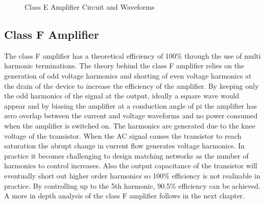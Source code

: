 \begin{figure}
    \caption{Class E Amplifier Circuit and Waveforms\cite{C.Cripps2006}}\label{fig:class_e}
\end{figure}

\subsection{Class F Amplifier}

The class F amplifier has a theoretical efficiency of 100\% through the use of multi harmonic terminations. The theory behind the class F amplifier relies on the generation of odd voltage harmonics and shorting of even voltage harmonics at the drain of the device to increase the efficiency of the amplifier. By keeping only the odd harmonics of the signal at the output, ideally a square wave would appear and by biasing the amplifier at a conduction angle of pi the amplifier has zero overlap between the current and voltage waveforms and no power consumed when the amplifier is switched on.
The harmonics are generated due to the knee voltage of the transistor. When the AC signal causes the transistor to reach saturation the abrupt change in current flow generates voltage harmonics. In practice it becomes challenging to design matching networks as the number of harmonics to control increases. Also the output capacitance of the transistor will eventually short out higher order harmonics so 100\% efficiency is not realizable in practice. By controlling up to the 5th harmonic, 90.5\% efficiency can be achieved. A more in depth analysis of the class F amplifier follows in the next chapter.

